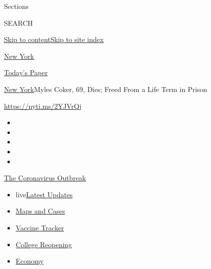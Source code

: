 Sections

SEARCH

\protect\hyperlink{site-content}{Skip to
content}\protect\hyperlink{site-index}{Skip to site index}

\href{https://www.nytimes.com/section/nyregion}{New York}

\href{https://myaccount.nytimes.com/auth/login?response_type=cookie\&client_id=vi}{}

\href{https://www.nytimes.com/section/todayspaper}{Today's Paper}

\href{/section/nyregion}{New York}\textbar{}Myles Coker, 69, Dies; Freed
From a Life Term in Prison

\url{https://nyti.ms/2YJVrQj}

\begin{itemize}
\item
\item
\item
\item
\item
\end{itemize}

\href{https://www.nytimes.com/news-event/coronavirus?action=click\&pgtype=Article\&state=default\&region=TOP_BANNER\&context=storylines_menu}{The
Coronavirus Outbreak}

\begin{itemize}
\tightlist
\item
  live\href{https://www.nytimes.com/2020/08/03/world/coronavirus-covid-19.html?action=click\&pgtype=Article\&state=default\&region=TOP_BANNER\&context=storylines_menu}{Latest
  Updates}
\item
  \href{https://www.nytimes.com/interactive/2020/us/coronavirus-us-cases.html?action=click\&pgtype=Article\&state=default\&region=TOP_BANNER\&context=storylines_menu}{Maps
  and Cases}
\item
  \href{https://www.nytimes.com/interactive/2020/science/coronavirus-vaccine-tracker.html?action=click\&pgtype=Article\&state=default\&region=TOP_BANNER\&context=storylines_menu}{Vaccine
  Tracker}
\item
  \href{https://www.nytimes.com/2020/08/02/us/covid-college-reopening.html?action=click\&pgtype=Article\&state=default\&region=TOP_BANNER\&context=storylines_menu}{College
  Reopening}
\item
  \href{https://www.nytimes.com/live/2020/08/03/business/stock-market-today-coronavirus?action=click\&pgtype=Article\&state=default\&region=TOP_BANNER\&context=storylines_menu}{Economy}
\end{itemize}

